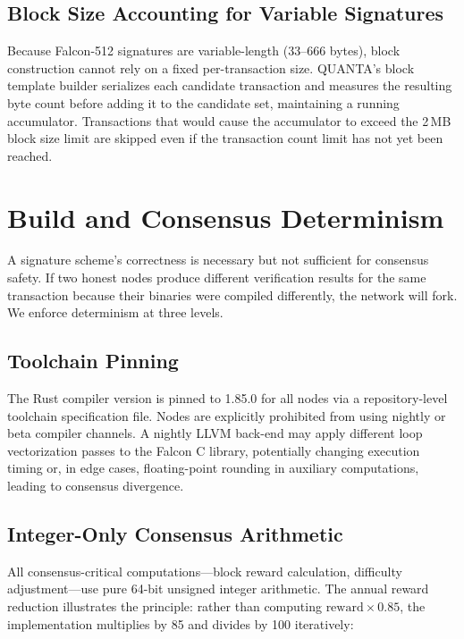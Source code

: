 \documentclass[11pt,a4paper]{article}
\begin{document}
\subsection{Block Size Accounting for Variable Signatures}
\label{subsec:blocksize}

Because Falcon-512 signatures are variable-length (33--666 bytes), block
construction cannot rely on a fixed per-transaction size. QUANTA's block
template builder serializes each candidate transaction and measures the
resulting byte count before adding it to the candidate set, maintaining a
running accumulator. Transactions that would cause the accumulator to exceed
the 2\,MB block size limit are skipped even if the transaction count limit has
not yet been reached.

\section{Build and Consensus Determinism}
\label{sec:determinism}

A signature scheme's correctness is necessary but not sufficient for consensus
safety. If two honest nodes produce different verification results for the same
transaction because their binaries were compiled differently, the network will
fork. We enforce determinism at three levels.

\subsection{Toolchain Pinning}

The Rust compiler version is pinned to 1.85.0 for all nodes via a
repository-level toolchain specification file. Nodes are explicitly prohibited
from using nightly or beta compiler channels. A nightly LLVM back-end may
apply different loop vectorization passes to the Falcon C library, potentially
changing execution timing or, in edge cases, floating-point rounding in
auxiliary computations, leading to consensus divergence.

\subsection{Integer-Only Consensus Arithmetic}

All consensus-critical computations---block reward calculation, difficulty
adjustment---use pure 64-bit unsigned integer arithmetic. The annual reward
reduction illustrates the principle: rather than computing
$\text{reward} \times 0.85$, the implementation multiplies by 85 and divides
by 100 iteratively:
\end{document}

